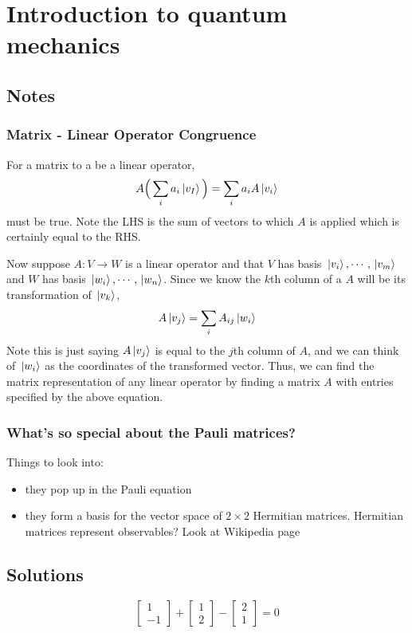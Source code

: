 \chapter{Introduction to quantum mechanics}

\section{Notes}

\subsection{Matrix - Linear Operator Congruence}

For a matrix to a be a linear operator, 
$$A \Big( \sum_{i} a_{i} \ket*{v_{I}} \Big) = \sum_{i} a_{i} A \ket*{v_{i}}$$
must be true. Note the LHS is the sum of vectors to which $A$ is applied which is certainly equal to the RHS. 

Now suppose $A: V \rightarrow W$ is a linear operator and that $V$ has basis $\ket*{v_{i}}, \cdots, \ket*{v_{m}}$ and $W$ has basis $\ket*{w_{i}}, \cdots, \ket*{w_{n}}$. Since we know the $k$th column of a $A$ will be its transformation of $\ket*{v_{k}}$, 
$$A \ket*{v_{j}} = \sum_{i} A_{ij} \ket*{w_{i}}$$
Note this is just saying $A \ket*{v_{j}}$ is equal to the $j$th column of $A$, and we can think of $\ket*{w_{i}}$ as the coordinates of the transformed vector. Thus, we can find the matrix representation of any linear operator by finding a matrix $A$ with entries specified by the above equation. 

\subsection{What's so special about the Pauli matrices?}

Things to look into: \begin{itemize}
\item they pop up in the Pauli equation 
\item they form a basis for the vector space of $2 \times 2$ Hermitian matrices. Hermitian matrices represent observables? Look at Wikipedia page
\end{itemize}

\section{Solutions}

\exercise
$$\begin{bmatrix}
1 \\
-1
\end{bmatrix} + \begin{bmatrix}
1 \\
2 
\end{bmatrix} - \begin{bmatrix}
2 \\
1
\end{bmatrix} = 0$$


